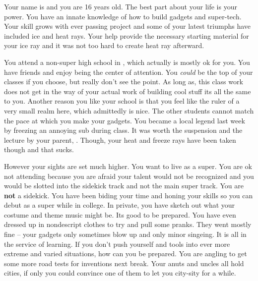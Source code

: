 \documentclass[char]{LRSguildcamp1}
\begin{document}
\name{\cTeen{}}



Your name is \cTeen{\intro} and you are 16 years old. The best part about your life is your power. You have an innate knowledge of how to build gadgets and super-tech. Your skill grows with ever passing project and some of your latest triumphs have included ice and heat rays. Your \cOldest{\uncle} help provide the necessary starting material for your ice ray and it was not too hard to create heat ray afterward. 

You attend \pNormalSchool{} a non-super high school in \pCityArchitect{}, which actually is mostly ok for you. You have friends and enjoy being the center of attention. You \textsl{could} be the top of your classes if you choose, but really don't see the point. As long as, this class work does not get in the way of your actual work of building cool stuff its all the same to you. Another reason you like your school is that you feel like the ruler of a very small realm here, which admittedly is nice. The other students cannot match the pace at which you make your gadgets. You became a local legend last week by freezing an annoying sub during class. It was worth the suspension and the lecture by your parent, \cArchitect{}. Though, your heat and freeze rays have been taken though and that sucks. 

However your sights are set much higher. You want to live as a super. You are ok not attending \pSuperSchool{} because you are afraid your talent would not be recognized and you would be slotted into the sidekick track and not the main super track. You are \textbf{not} a sidekick. You have been biding your time and honing your skills so you can debut as a super while in college. In private, you have sketch out what your costume and theme music might be. Its good to be prepared. You have even dressed up in nondescript clothes to try and pull some pranks.  They went mostly fine -- your gadgets only sometimes blow up and only minor singeing.  It is all in the service of learning. If you don't push yourself and tools into ever more extreme and varied situations, how can you be prepared. You are angling to get some more road tests for inventions next break. Your anuts and uncles all hold cities, if only you could convince one of them to let you city-sity for a while.
\end{document}
